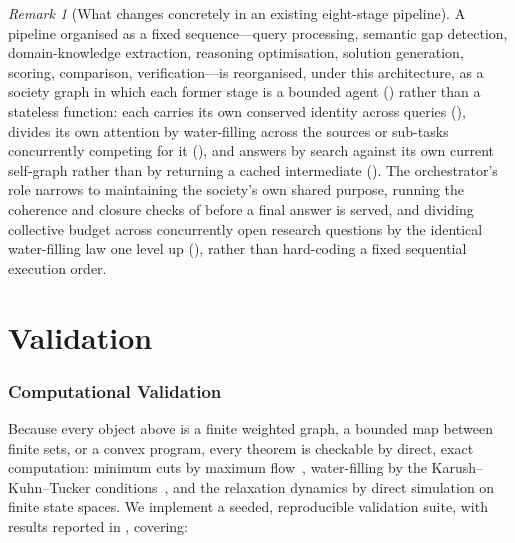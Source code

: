 \documentclass[11pt,twocolumn,a4paper]{article}
\theoremstyle{frathm}
\theoremstyle{definition}
\theoremstyle{remark}
\newtheorem{remark}[theorem]{Remark}
\begin{document}
\begin{remark}[What changes concretely in an existing eight-stage
pipeline]
\label{rem:concrete-change}
A pipeline organised as a fixed sequence---query processing, semantic
gap detection, domain-knowledge extraction, reasoning optimisation,
solution generation, scoring, comparison, verification---is reorganised,
under this architecture, as a society graph in which each former stage is
a bounded agent () rather than a stateless function:
each carries its own conserved identity across queries
(), divides its own attention by water-filling
across the sources or sub-tasks concurrently competing for it
(), and answers by search against its own current
self-graph rather than by returning a cached intermediate
(). The orchestrator's role narrows to maintaining the
society's own shared purpose, running the coherence and closure checks of
 before a final answer is
served, and dividing collective budget across concurrently open research
questions by the identical water-filling law one level up
(), rather than hard-coding a fixed sequential
execution order.
\end{remark}

\part{Validation}

\section{Computational Validation}
\label{sec:validation}

Because every object above is a finite weighted graph, a bounded map
between finite sets, or a convex program, every theorem is checkable by
direct, exact computation: minimum cuts by maximum
flow~\citep{fordfulkerson1956,menger1927}, water-filling by the
Karush--Kuhn--Tucker conditions~\citep{boyd2004,kuhntucker1951}, and the
relaxation dynamics by direct simulation on finite state spaces. We
implement a seeded, reproducible validation suite, with results reported
in , covering:
\end{document}
